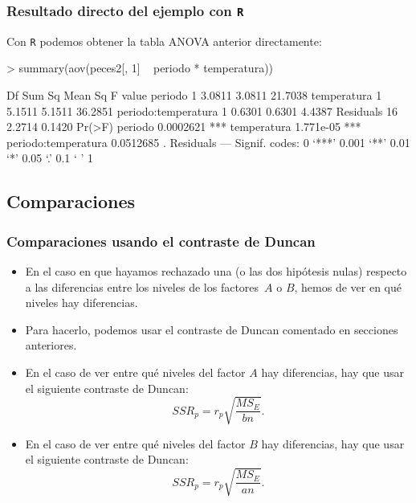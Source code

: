 \begin{frame}[fragile]
\frametitle{Resultado directo del ejemplo con {\tt R}}
Con {\tt R} podemos obtener la tabla ANOVA anterior directamente:
{\footnotesize
\begin{Schunk}
\begin{Sinput}
> summary(aov(peces2[, 1] ~ periodo * temperatura))
\end{Sinput}
\begin{Soutput}
                    Df Sum Sq Mean Sq F value
periodo              1 3.0811  3.0811 21.7038
temperatura          1 5.1511  5.1511 36.2851
periodo:temperatura  1 0.6301  0.6301  4.4387
Residuals           16 2.2714  0.1420        
                       Pr(>F)    
periodo             0.0002621 ***
temperatura         1.771e-05 ***
periodo:temperatura 0.0512685 .  
Residuals                        
---
Signif. codes:  0 ‘***’ 0.001 ‘**’ 0.01 ‘*’ 0.05 ‘.’ 0.1 ‘ ’ 1 
\end{Soutput}
\end{Schunk}
}
\end{frame}
\subsection{Comparaciones}
\begin{frame}
\frametitle{Comparaciones usando el contraste de Duncan}
\begin{itemize}
\item<2-> En el caso en que hayamos rechazado una (o las dos hipótesis nulas) respecto a las diferencias entre los niveles de los factores~$A$ o $B$,
hemos de ver en qué niveles hay diferencias.
\item<3-> Para hacerlo, podemos usar el contraste de Duncan comentado en secciones anteriores.
\item<4-> En el caso de ver entre qué niveles del factor $A$ hay diferencias, hay que usar el siguiente contraste de Duncan:
\[
SSR_p = r_p \sqrt{\frac{MS_E}{bn}}.
\]
\item<5-> En el caso de ver entre qué niveles del factor $B$ hay diferencias, hay que usar el siguiente contraste de Duncan:
\[
SSR_p = r_p \sqrt{\frac{MS_E}{an}}.
\]
\end{itemize}
\end{frame}
